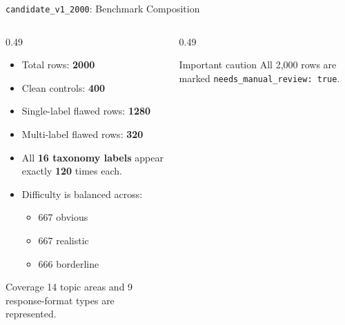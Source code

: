 \documentclass[aspectratio=169]{beamer}
\begin{document}
\begin{frame}[shrink=4]{\texttt{candidate\_v1\_2000}: Benchmark Composition}
  \begin{columns}[T,onlytextwidth]
    \begin{column}{0.49\textwidth}
      \small
      \begin{itemize}
        \item Total rows: \textbf{2000}
        \item Clean controls: \textbf{400}
        \item Single-label flawed rows: \textbf{1280}
        \item Multi-label flawed rows: \textbf{320}
        \item All \textbf{16 taxonomy labels} appear exactly \textbf{120} times each.
        \item Difficulty is balanced across:
        \begin{itemize}
          \item 667 obvious
          \item 667 realistic
          \item 666 borderline
        \end{itemize}
      \end{itemize}

      \begin{block}{Coverage}
        14 topic areas and 9 response-format types are represented.
      \end{block}
    \end{column}
    \begin{column}{0.49\textwidth}
      \scriptsize
      \centering

      \vspace{0.08cm}

      \begin{alertblock}{Important caution}
        All 2{,}000 rows are marked \texttt{needs\_manual\_review: true}.
      \end{alertblock}
    \end{column}
  \end{columns}
\end{frame}
\end{document}
